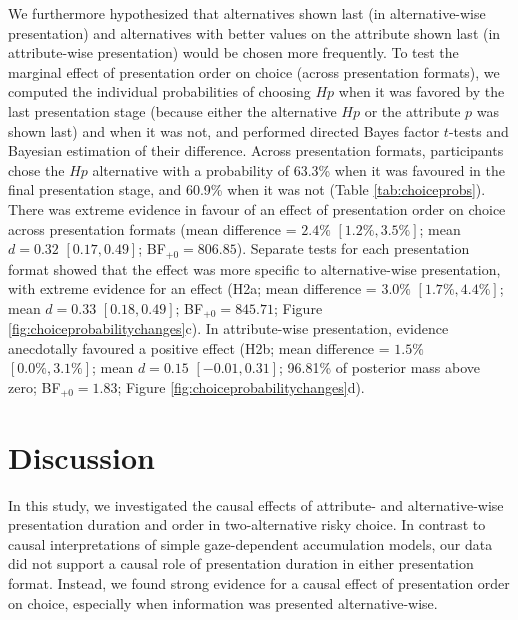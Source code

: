 \documentclass[11pt, a4paper, twocolumn, abstract]{scrartcl}
\begin{document}
We furthermore hypothesized that alternatives shown last (in alternative-wise presentation) and alternatives with better values on the attribute shown last (in attribute-wise presentation) would be chosen more frequently. 
To test the marginal effect of presentation order on choice (across presentation formats), we computed the individual probabilities of choosing $Hp$ when it was favored by the last presentation stage (because either the alternative $Hp$ or the attribute $p$ was shown last) and when it was not, and performed directed Bayes factor $t$-tests and Bayesian estimation of their difference. 
Across presentation formats, participants chose the $Hp$ alternative with a probability of 63.3\% when it was favoured in the final presentation stage, and 60.9\% when it was not (Table \ref{tab:choiceprobs}).
There was extreme evidence in favour of an effect of presentation order on choice across  presentation formats (mean difference = $2.4\%$ $[1.2\%, 3.5\%]$; mean $d = 0.32$ $[0.17, 0.49]$; BF$_{{+}0} = 806.85$). 
Separate tests for each presentation format showed that the effect was more specific to alternative-wise presentation, with extreme evidence for an effect (H2a; mean difference = $3.0\%$ $[1.7\%, 4.4\%]$; mean $d = 0.33$ $[0.18, 0.49]$; BF$_{{+}0} = 845.71$; Figure \ref{fig:choiceprobabilitychanges}c). In attribute-wise presentation, evidence anecdotally favoured a positive effect (H2b; mean difference = $1.5\%$ $[0.0\%, 3.1\%]$; mean $d = 0.15$ $[-0.01, 0.31]$; 96.81\% of posterior mass above zero; BF$_{{+}0} = 1.83$; Figure \ref{fig:choiceprobabilitychanges}d).


\section*{Discussion}

In this study, we investigated the causal effects of attribute- and alternative-wise presentation duration and order in two-alternative risky choice. In contrast to causal interpretations of simple gaze-dependent accumulation models, our data did not support a causal role of presentation duration in either presentation format. Instead, we found strong evidence for a causal effect of presentation order on choice, especially when information was presented alternative-wise.

\end{document}
